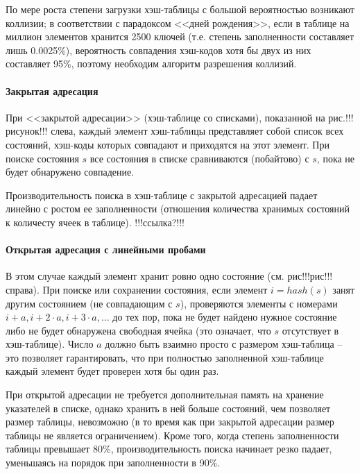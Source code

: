 По мере роста степени загрузки хэш-таблицы с большой вероятностью возникают коллизии; в
соответствии с парадоксом <<дней рождения>>, если в таблице на миллион элементов хранится
2500 ключей (т.е. степень заполненности составляет лишь 0.0025\%), вероятность совпадения
хэш-кодов хотя бы двух из них составляет 95\%, поэтому необходим алгоритм разрешения
коллизий.

\paragraph{Закрытая адресация}
\label{sec:closed-addressing}

При <<закрытой адресации>> (хэш-таблице со списками), показанной на рис.!!!рисунок!!! слева,
каждый элемент хэш-таблицы представляет собой список всех состояний, хэш-коды которых
совпадают и приходятся на этот элемент. При поиске состояния $s$ все состояния в списке
сравниваются (побайтово) с $s$, пока не будет обнаружено совпадение.

Производительность поиска в хэш-таблице с закрытой адресацией падает линейно с ростом ее
заполненности (отношения количества хранимых состояний к количесту ячеек в таблице). !!!ссылка?!!!

\paragraph{Открытая адресация с линейными пробами}
\label{sec:open-linear-probing}

В этом случае каждый элемент хранит ровно одно состояние (см. рис!!!рис!!! справа). При
поиске или сохранении состояния, если элемент $i = hash(s)$ занят другим состоянием (не
совпадающим с $s$), проверяются элементы с номерами $i + a, i + 2 \cdot a, i + 3 \cdot a,
\ldots$ до тех пор, пока не будет найдено нужное состояние либо не будет обнаружена
свободная ячейка (это означает, что $s$ отсутствует в хэш-таблице). Число $a$ должно быть
взаимно просто с размером хэш-таблица -- это позволяет гарантировать, что при полностью
заполненной хэш-таблице каждый элемент будет проверен хотя бы один раз.

При открытой адресации не требуется дополнительная память на хранение указателей в списке,
однако хранить в ней больше состояний, чем позволяет размер таблицы, невозможно (в то
время как при закрытой адресации размер таблицы не является ограничением). Кроме того,
когда степень заполненности таблицы превышает 80\%, производительность поиска начинает
резко падает, уменьшаясь на порядок при заполненности в 90\%.


